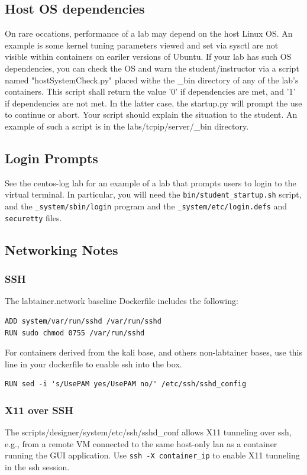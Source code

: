 \documentclass[12pt]{article}
\begin{document}
\subsection{Host OS dependencies}
On rare occations, performance of a lab may depend on the host Linux OS.  An example is some
kernel tuning parameters viewed and set via sysctl are not visible within containers on eariler versions
of Ubuntu.  If your lab has such OS dependencies, you can check the OS and warn the student/instructor via a script
named "hostSystemCheck.py" placed withe the \_bin directory of any of the lab's containers.  This script shall
return the value '0' if dependencies are met, and '1' if dependencies are not met.  In the latter case, the 
startup.py will prompt the use to continue or abort.  Your script should explain the situation to the student.
An example of such a script is in the labs/tcpip/server/\_bin directory.
\subsection{Login Prompts}
See the centos-log lab for an example of a lab that prompts users to login to the virtual terminal.
In particular, you will need the {\tt bin/student\_startup.sh} script, and the {\tt \_system/sbin/login} program and the {\tt \_system/etc/login.defs} and {\tt securetty} files.

\subsection{Networking Notes}
\label{Networking Notes}
\subsubsection{SSH}
The labtainer.network baseline Dockerfile includes the following:
\begin{verbatim}
ADD system/var/run/sshd /var/run/sshd
RUN sudo chmod 0755 /var/run/sshd
\end{verbatim}

For containers derived from the kali base, and others non-labtainer bases, use this line in your dockerfile
to enable ssh into the box.
\begin{verbatim}
RUN sed -i 's/UsePAM yes/UsePAM no/' /etc/ssh/sshd_config
\end{verbatim}
\subsubsection{X11 over SSH}
The scripts/designer/system/etc/ssh/sshd\_conf allows X11 tunneling over ssh, e.g.,
from a remote VM connected to the same host-only lan as a container running the GUI
application.  Use {\tt ssh -X container\_ip} to enable X11 tunneling in the ssh session.
\end{document}
